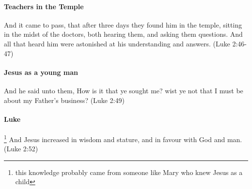 \paragraph{Teachers in the Temple}
And it came to pass, that after three days they found him in the temple, sitting in the midst of the doctors, both hearing them, and asking them questions. And all that heard him were astonished at his understanding and answers. (Luke 2:46-47)

\paragraph{Jesus as a young man}
And he said unto them, How is it that ye sought me? wist ye not that I must be about my Father's business? (Luke 2:49)

\paragraph{Luke}\footnote{this knowledge probably came from someone like Mary who knew Jesus as a child}
And Jesus increased in wisdom and stature, and in favour with God and man. (Luke 2:52)
